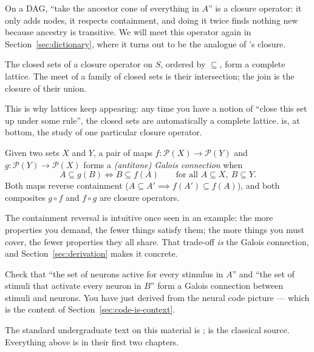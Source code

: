 \begin{example}
On a DAG, ``take the ancestor cone of everything in $A$'' is a closure
operator: it only adds nodes, it respects containment, and doing it twice
finds nothing new because ancestry is transitive. We will meet this operator
again in Section~\ref{sec:dictionary}, where it turns out to be the
\odag{} analogue of \fca{}'s closure.
\end{example}

\begin{proposition}
\label{prop:closed-sets-lattice}
The closed sets of a closure operator on $S$, ordered by $\subseteq$, form a
complete lattice. The meet of a family of closed sets is their intersection;
the join is the closure of their union.
\end{proposition}

This is why lattices keep appearing: any time you have a notion of ``close
this set up under some rule'', the closed sets are automatically a complete
lattice. \fca{} is, at bottom, the study of one particular closure operator.

\begin{definition}
Given two sets $X$ and $Y$, a pair of maps
$f: \mathcal{P}(X) \to \mathcal{P}(Y)$ and
$g: \mathcal{P}(Y) \to \mathcal{P}(X)$ forms a \emph{(antitone) Galois
connection} when
\[
  A \subseteq g(B) \iff B \subseteq f(A)
  \qquad\text{for all } A \subseteq X,\ B \subseteq Y .
\]
Both maps reverse containment ($A \subseteq A' \implies f(A') \subseteq
f(A)$), and both composites $g \circ f$ and $f \circ g$ are closure operators.
\end{definition}

The containment reversal is intuitive once seen in an example: the more
properties you demand, the fewer things satisfy them; the more things you must
cover, the fewer properties they all share. That trade-off \emph{is} the
Galois connection, and Section~\ref{sec:derivation} makes it concrete.

\begin{exercise}
Check that ``the set of neurons active for every stimulus in $A$'' and ``the
set of stimuli that activate every neuron in $B$'' form a Galois connection
between stimuli and neurons. You have just derived \fca{} from the neural code
picture --- which is the content of Section~\ref{sec:code-is-context}.
\end{exercise}

\begin{remark}
The standard undergraduate text on this material is
\citet{davey2002}; \citet{birkhoff1940} is the classical source. Everything
above is in their first two chapters.
\end{remark}

